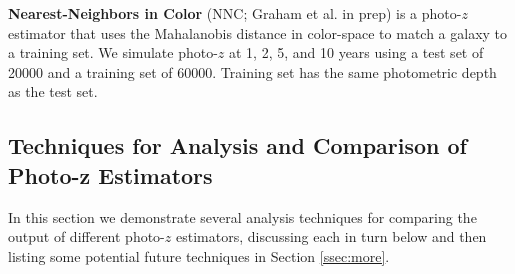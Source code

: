 \documentclass[DM,lsstdraft,toc]{lsstdoc}
\begin{document}
{\bf Nearest-Neighbors in Color} (NNC; Graham et al. in prep) is a photo-$z$ estimator that uses the Mahalanobis distance in color-space to match a galaxy to a training set. We simulate photo-$z$ at 1, 2, 5, and 10 years using a test set of 20000 and a training set of 60000. Training set has the same photometric depth as the test set. 


\subsection{Techniques for Analysis and Comparison of Photo-z Estimators}\label{ssec:comp}

In this section we demonstrate several analysis techniques for comparing the output of different photo-$z$ estimators, discussing each in turn below and then listing some potential future techniques in Section \ref{ssec:more}.
\end{document}
